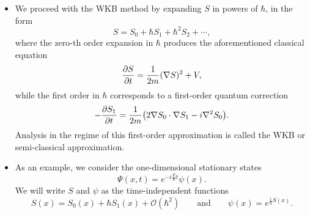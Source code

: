 \documentclass[11pt, a4paper]{article}
\renewcommand{\grad}{\nabla}
\renewcommand{\laplacian}{\nabla^{2}}
\begin{document}
\begin{itemize}
    \item We proceed with the WKB method by expanding $ S $ in powers of $ \hbar $, in the form
    \begin{equation*}
        S = S_{0} + \hbar S_{1} + \hbar^{2}S_{2} + \cdots,
    \end{equation*}
    where the zero-th order expansion in $ \hbar $ produces the aforementioned classical equation
    \begin{equation*}
        \pdv{S}{t} = \frac{1}{2m}(\grad S)^{2} + V,
    \end{equation*}
    while the first order in $ \hbar $ corresponds to a first-order quantum correction
    \begin{equation*}
        - \pdv{S_{1}}{t} = \frac{1}{2m} \big( 2 \grad S_{0} \cdot \grad S_{1} - i \laplacian S_{0} \big).
    \end{equation*}
    Analysis in the regime of this first-order approximation is called the WKB or semi-classical approximation.

    \item As an example, we consider the one-dimensional stationary states
    \begin{equation*}
        \Psi(x, t) = e^{-i \frac{E}{\hbar}t} \psi(x).
    \end{equation*}
    We will write $ S $ and $ \psi $ as the time-independent functions
    \begin{equation*}
        S(x) = S_{0}(x) + \hbar S_{1}(x) + \mathcal{O}(\hbar^{2}) \qquad \text{and} \qquad \psi(x) = e^{\frac{i}{\hbar}S(x)}.
    \end{equation*}
    

\end{itemize}
\end{document}
